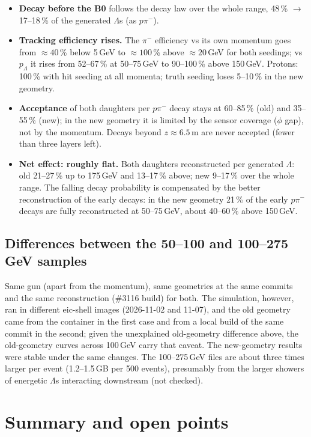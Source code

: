 \documentclass[11pt,a4paper]{article}
\begin{document}
\begin{itemize}
\item \textbf{Decay before the B0} follows the decay law over the whole range, 48\,\% $\to$
17--18\,\% of the generated $\Lambda$s (as $p\pi^-$).
\item \textbf{Tracking efficiency rises.} The $\pi^-$ efficiency vs its own momentum goes from
$\approx 40$\,\% below 5\,GeV to $\approx 100$\,\% above $\approx 20$\,GeV for both seedings; vs
$p_\Lambda$ it rises from 52--67\,\% at 50--75\,GeV to 90--100\,\% above 150\,GeV. Protons: 100\,\%
with hit seeding at all momenta; truth seeding loses 5--10\,\% in the new geometry.
\item \textbf{Acceptance} of both daughters per $p\pi^-$ decay stays at 60--85\,\% (old) and
35--55\,\% (new); in the new geometry it is limited by the sensor coverage ($\phi$ gap), not by
the momentum. Decays beyond $z \approx 6.5$\,m are never accepted (fewer than three layers left).
\item \textbf{Net effect: roughly flat.} Both daughters reconstructed per generated $\Lambda$:
old 21--27\,\% up to 175\,GeV and 13--17\,\% above; new 9--17\,\% over the whole range. The
falling decay probability is compensated by the better reconstruction of the early decays: in the
new geometry 21\,\% of the early $p\pi^-$ decays are fully reconstructed at 50--75\,GeV, about
40--60\,\% above 150\,GeV.
\end{itemize}

\subsection{Differences between the 50--100 and 100--275\,GeV samples}
Same gun (apart from the momentum), same geometries at the same commits and the same
reconstruction (\#3116 build) for both. The simulation, however, ran in different eic-shell images
(2026-11-02 and 11-07), and the old geometry came from the container in the first case and from a
local build of the same commit in the second; given the unexplained old-geometry difference above,
the old-geometry curves across 100\,GeV carry that caveat. The new-geometry results were stable
under the same changes. The 100--275\,GeV files are about three times larger per event
(1.2--1.5\,GB per 500 events), presumably from the larger showers of energetic $\Lambda$s
interacting downstream (not checked).

\section{Summary and open points}
\end{document}
